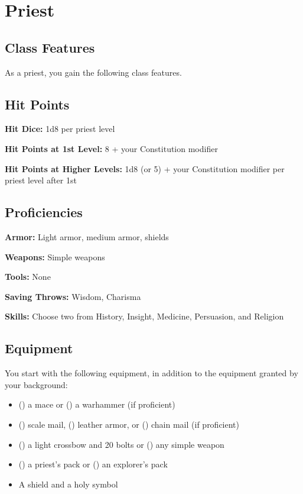 \section{Priest}

\subsection{Class Features}

As a priest, you gain the following class features.

\subsection{Hit Points}

\textbf{Hit Dice:} 1d8 per priest level

\textbf{Hit Points at 1st Level:} 8 + your Constitution modifier

\textbf{Hit Points at Higher Levels:} 1d8 (or 5) + your Constitution modifier per priest level after 1st

\subsection{Proficiencies}

\textbf{Armor:} Light armor, medium armor, shields

\textbf{Weapons:} Simple weapons

\textbf{Tools:} None

\textbf{Saving Throws:} Wisdom, Charisma

\textbf{Skills:} Choose two from History, Insight, Medicine, Persuasion, and Religion

\subsection{Equipment}

You start with the following equipment, in addition to the equipment granted by your background:
\begin{itemize}
\item () a mace or () a warhammer (if proficient)
\item () scale mail, () leather armor, or () chain mail (if proficient)
\item () a light crossbow and 20 bolts or () any simple weapon
\item () a priest’s pack or () an explorer’s pack
\item A shield and a holy symbol
\end{itemize}

